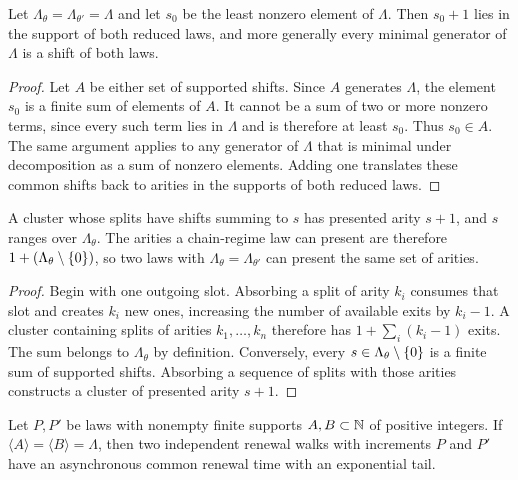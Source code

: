 \begin{lemma}
\label{thm:least-shift}
\leanok
{}
Let $\Lambda_{\theta}=\Lambda_{\theta'}=\Lambda$ and let $s_0$ be the least nonzero element of
$\Lambda$. Then $s_0+1$ lies in the support of both reduced laws, and more generally every
minimal generator of $\Lambda$ is a shift of both laws.
\end{lemma}

\begin{proof}
\leanok
Let $A$ be either set of supported shifts. Since $A$ generates $\Lambda$, the element $s_0$
is a finite sum of elements of $A$. It cannot be a sum of two or more nonzero terms, since every
such term lies in $\Lambda$ and is therefore at least $s_0$. Thus $s_0\in A$. The same argument
applies to any generator of $\Lambda$ that is minimal under decomposition as a sum of nonzero
elements. Adding one translates these common shifts back to arities in the supports of both
reduced laws.
\end{proof}

\begin{lemma}
\label{thm:reachable-arity}
\leanok
A cluster whose splits have shifts summing to $s$ has presented arity $s+1$, and $s$ ranges over
$\Lambda_{\theta}$. The arities a chain-regime law can present are therefore
$1+(\Lambda_{\theta}\setminus\{0\})$, so two laws with $\Lambda_{\theta}=\Lambda_{\theta'}$ can
present the same set of arities.
\end{lemma}

\begin{proof}
\leanok
{}
Begin with one outgoing slot. Absorbing a split of arity $k_i$ consumes that slot and creates
$k_i$ new ones, increasing the number of available exits by $k_i-1$. A cluster containing splits
of arities $k_1,\dots,k_n$ therefore has
$1+\sum_i(k_i-1)$ exits. The sum belongs to $\Lambda_\theta$ by definition. Conversely, every
$s\in\Lambda_\theta\setminus\{0\}$ is a finite sum of supported shifts. Absorbing a sequence of
splits with those arities constructs a cluster of presented arity $s+1$.
\end{proof}

\begin{lemma}
\label{thm:common-renewal}
\leanok
Let $P,P'$ be laws with nonempty finite supports $A,B\subset\mathbb{N}$ of positive integers. If
$\langle A\rangle=\langle B\rangle=\Lambda$, then two independent renewal walks with increments
$P$ and $P'$ have an asynchronous common renewal time with an exponential tail.
\end{lemma}


